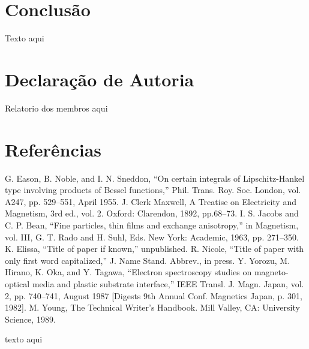 \documentclass[relatorio]{IEEEtran}
\begin{document}
\section{Conclusão}
Texto aqui

\section{Declaração de Autoria}
Relatorio dos membros aqui

\section*{Referências}

\begin{thebibliography}{00}
 G. Eason, B. Noble, and I. N. Sneddon, ``On certain integrals of Lipschitz-Hankel type involving products of Bessel functions,'' Phil. Trans. Roy. Soc. London, vol. A247, pp. 529--551, April 1955.
 J. Clerk Maxwell, A Treatise on Electricity and Magnetism, 3rd ed., vol. 2. Oxford: Clarendon, 1892, pp.68--73.
 I. S. Jacobs and C. P. Bean, ``Fine particles, thin films and exchange anisotropy,'' in Magnetism, vol. III, G. T. Rado and H. Suhl, Eds. New York: Academic, 1963, pp. 271--350.
 K. Elissa, ``Title of paper if known,'' unpublished.
 R. Nicole, ``Title of paper with only first word capitalized,'' J. Name Stand. Abbrev., in press.
 Y. Yorozu, M. Hirano, K. Oka, and Y. Tagawa, ``Electron spectroscopy studies on magneto-optical media and plastic substrate interface,'' IEEE Transl. J. Magn. Japan, vol. 2, pp. 740--741, August 1987 [Digests 9th Annual Conf. Magnetics Japan, p. 301, 1982].
 M. Young, The Technical Writer's Handbook. Mill Valley, CA: University Science, 1989.
\end{thebibliography}
\vspace{12pt}
\color{red}
texto aqui
\end{document}
